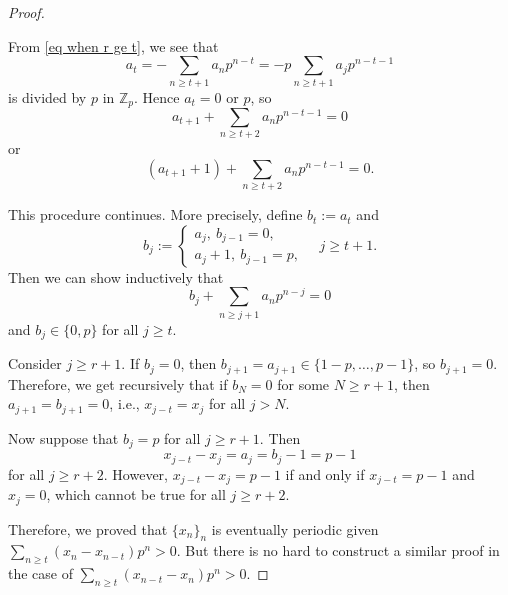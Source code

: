 \documentclass{article}
\theoremstyle{definition}
\theoremstyle{remark}
\newcommand{\Z}{\mathbb{Z}}
\begin{document}
\begin{proof}
\begin{enumerate}
    From \cref{eq when r ge t}, we see that \[ a_t = -\sum_{n \ge t+1} a_np^{n-t} = -p\sum_{n\ge t +1}a_jp^{n-t-1}\] is divided by $p$ in $\Z_p$.
    Hence $a_t = 0$ or $p$, so \[a_{t + 1} + \sum_{n\ge t + 2}a_np^{n-t-1} = 0\] or \[(a_{t + 1} + 1) + \sum_{n\ge t + 2}a_np^{n-t-1} = 0.\]
    
    This procedure continues. More precisely, define $b_t := a_t$ and \[b_j := \begin{cases}
        a_j,\ b_{j-1} = 0,\\
        a_j + 1,\ b_{j-1} = p,
    \end{cases}\quad j\ge t + 1. \]
    Then we can show inductively that \begin{equation}\label{bj + sum eq 0}
        b_j + \sum_{n\ge j + 1}a_np^{n-j} = 0
    \end{equation} and $b_j\in\{0, p\}$ for all $j\ge t$.

    Consider $j \ge r+1$.
    If $b_j = 0$, then $b_{j + 1} = a_{j+1}\in\{1-p, \dots, p-1\}$, so $b_{j+1} = 0$. Therefore, we get recursively that if $b_N = 0$ for some $N\ge r + 1$, then $a_{j + 1} = b_{j+1} = 0$, i.e., $x_{j - t} = x_j$ for all $j> N$.

    Now suppose that $b_j = p$ for all $j \ge r + 1$. Then \[x_{j-t} - x_j = a_j = b_j - 1 = p -1\] for all $j\ge r  +2$.
    However, $x_{j-t} -x_j = p - 1$ if and only if $x_{j-t} = p-1$ and $x_j = 0$,
    which cannot be true for all $j\ge r  +2$.
    
\end{enumerate}
Therefore, we proved that $\{x_n\}_n$ is eventually periodic given $\sum_{n\ge t}(x_n-x_{n-t})p^n > 0$.
But there is no hard to construct a similar proof in the case of $\sum_{n\ge t}(x_{n-t}-x_{n})p^n > 0$.
\end{proof}
\end{document}
